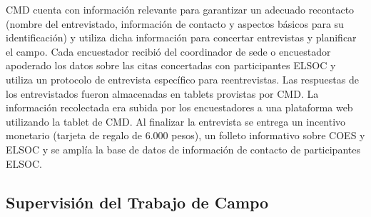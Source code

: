 \documentclass[12pt]{report}
\begin{document}
CMD cuenta con información relevante para garantizar un adecuado recontacto (nombre del entrevistado, información de contacto y aspectos básicos para su identificación) y utiliza dicha información para concertar entrevistas y planificar el campo. Cada encuestador recibió del coordinador de sede o encuestador apoderado los datos sobre las citas concertadas con participantes ELSOC y utiliza un protocolo de entrevista específico para reentrevistas.  Las respuestas de los entrevistados fueron almacenadas en tablets provistas por CMD. La información recolectada era subida por los encuestadores a una plataforma web utilizando la tablet de CMD. Al finalizar la entrevista se entrega un incentivo monetario (tarjeta de regalo de 6.000 pesos), un folleto informativo sobre COES y ELSOC y se amplía la base de datos de información de contacto de participantes ELSOC.\\


\subsection*{Supervisión del Trabajo de Campo}
\end{document}
